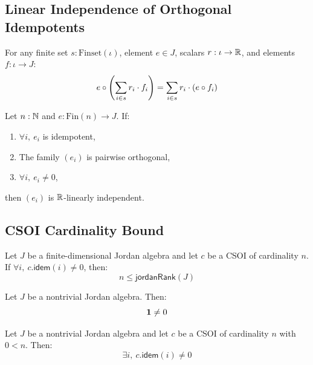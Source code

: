 \subsection{Linear Independence of Orthogonal Idempotents}

\begin{lemma}
For any finite set $s : \mathrm{Finset}(\iota)$, element $e \in J$, scalars $r : \iota \to \mathbb{R}$, and elements $f : \iota \to J$:
\[ e \circ \left( \sum_{i \in s} r_i \cdot f_i \right) = \sum_{i \in s} r_i \cdot (e \circ f_i) \]
\end{lemma}

\begin{theorem}
Let $n : \mathbb{N}$ and $e : \mathrm{Fin}(n) \to J$. If:
\begin{enumerate}
  \item $\forall i,\ e_i$ is idempotent,
  \item The family $(e_i)$ is pairwise orthogonal,
  \item $\forall i,\ e_i \ne 0$,
\end{enumerate}
then $(e_i)$ is $\mathbb{R}$-linearly independent.
\end{theorem}

\subsection{CSOI Cardinality Bound}

\begin{theorem}
Let $J$ be a finite-dimensional Jordan algebra and let $c$ be a CSOI of cardinality $n$. If $\forall i,\ c.\mathsf{idem}(i) \ne 0$, then:
\[ n \le \mathsf{jordanRank}(J) \]
\end{theorem}

\begin{theorem}
Let $J$ be a nontrivial Jordan algebra. Then:
\[ \mathbf{1} \ne 0 \]
\end{theorem}

\begin{theorem}
Let $J$ be a nontrivial Jordan algebra and let $c$ be a CSOI of cardinality $n$ with $0 < n$. Then:
\[ \exists i,\ c.\mathsf{idem}(i) \ne 0 \]
\end{theorem}
